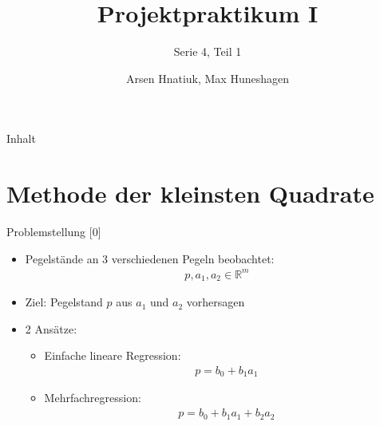 \documentclass{beamer}
\title{Projektpraktikum I}
\subtitle{Serie 4, Teil 1}
\author{Arsen Hnatiuk, Max Huneshagen}
\begin{document}
\begin{frame}
  \maketitle
\end{frame}

\begin{frame}{Inhalt}
  \tableofcontents
  
 \section{Methode der kleinsten Quadrate}  
  
 
\end{frame}

\begin{frame}{Problemstellung [0]}
	\begin{itemize}
		\item Pegelstände an 3 verschiedenen Pegeln beobachtet:
		\begin{align}
		p, a_1, a_2 \in \mathbb{R}^m
		\end{align}
		\item Ziel: Pegelstand $p$ aus $a_1$ und $a_2$ vorhersagen
		\pause
		\item 2 Ansätze:
		\begin{itemize}
			\item Einfache lineare Regression:
			\begin{align}
			p =b_0+b_1a_1
			\label{eq:lin_reg}
			\end{align}
			\item Mehrfachregression:
			\begin{align}
			p =b_0+b_1a_1+b_2a_2
			\label{eq:mehr_reg}
			\end{align}
		\end{itemize}
	\end{itemize}
	
\end{frame}
\end{document}
